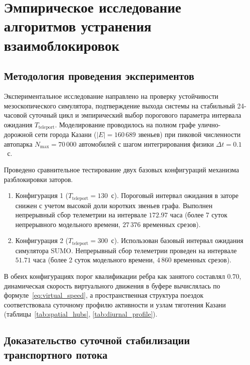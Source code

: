 \chapter{Эмпирическое исследование алгоритмов устранения взаимоблокировок}
\label{chap:experiments}

\section{Методология проведения экспериментов}
\label{sec:exp_methodology}

Экспериментальное исследование направлено на проверку устойчивости мезоскопического симулятора, подтверждение выхода системы на стабильный 24-часовой суточный цикл и эмпирический выбор порогового параметра интервала ожидания $T_{\text{teleport}}$. Моделирование проводилось на полном графе улично-дорожной сети города Казани ($|E| = 160\,689$ звеньев) при пиковой численности автопарка $N_{\max} = 70\,000$ автомобилей с шагом интегрирования физики $\Delta t = 0.1$~с.

Проведено сравнительное тестирование двух базовых конфигураций механизма разблокировки заторов.
\begin{enumerate}
    \item Конфигурация 1 ($T_{\text{teleport}} = 130$~с). Пороговый интервал ожидания в заторе снижен с учетом высокой доли коротких звеньев графа. Выполнен непрерывный сбор телеметрии на интервале $172.97$ часа (более 7 суток непрерывного модельного времени, $27\,376$ временных срезов).
    \item Конфигурация 2 ($T_{\text{teleport}} = 300$~с). Использован базовый интервал ожидания симулятора SUMO. Непрерывный сбор телеметрии проведен на интервале $51.71$ часа (более 2 суток модельного времени, $4\,860$ временных срезов).
\end{enumerate}

В обеих конфигурациях порог квалификации ребра как занятого составлял $0.70$, динамическая скорость виртуального движения в буфере вычислялась по формуле~\eqref{eq:virtual_speed}, а пространственная структура поездок соответствовала суточному профилю активности и узлам тяготения Казани (таблицы~\ref{tab:spatial_hubs}, \ref{tab:diurnal_profile}).

\section{Доказательство суточной стабилизации транспортного потока}
\label{sec:cyclic_stabilization}

